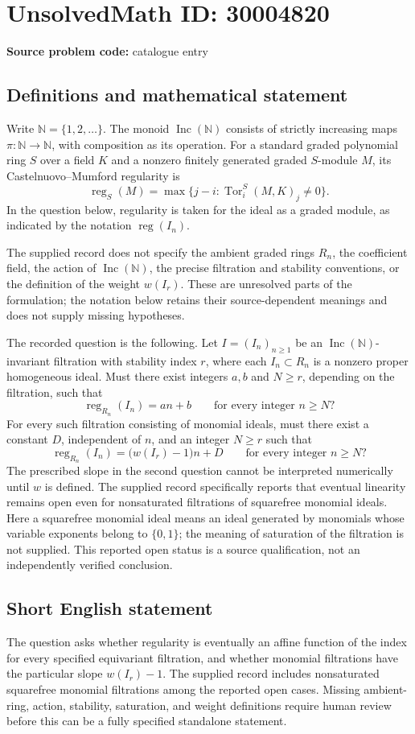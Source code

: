 \documentclass[11pt]{article}
\newcommand{\N}{\mathbb{N}}
\begin{document}
\section*{UnsolvedMath ID: 30004820}
\textbf{Source problem code:} catalogue entry
\subsection{Definitions and mathematical statement}
Write \(\N=\{1,2,\ldots\}\). The monoid \(\operatorname{Inc}(\N)\) consists of strictly increasing maps \(\pi:\N\to\N\), with composition as its operation. For a standard graded polynomial ring \(S\) over a field \(K\) and a nonzero finitely generated graded \(S\)-module \(M\), its Castelnuovo--Mumford regularity is
\[
\operatorname{reg}_S(M)=\max\{j-i:\operatorname{Tor}_i^S(M,K)_j\ne0\}.
\]
In the question below, regularity is taken for the ideal as a graded module, as indicated by the notation \(\operatorname{reg}(I_n)\).

The supplied record does not specify the ambient graded rings \(R_n\), the coefficient field, the action of \(\operatorname{Inc}(\N)\), the precise filtration and stability conventions, or the definition of the weight \(w(I_r)\). These are unresolved parts of the formulation; the notation below retains their source-dependent meanings and does not supply missing hypotheses.

The recorded question is the following. Let \(I=(I_n)_{n\ge1}\) be an \(\operatorname{Inc}(\N)\)-invariant filtration with stability index \(r\), where each \(I_n\subset R_n\) is a nonzero proper homogeneous ideal. Must there exist integers \(a,b\) and \(N\ge r\), depending on the filtration, such that
\[
\operatorname{reg}_{R_n}(I_n)=an+b
\qquad\text{for every integer }n\ge N?
\]
For every such filtration consisting of monomial ideals, must there exist a constant \(D\), independent of \(n\), and an integer \(N\ge r\) such that
\[
\operatorname{reg}_{R_n}(I_n)=\bigl(w(I_r)-1\bigr)n+D
\qquad\text{for every integer }n\ge N?
\]
The prescribed slope in the second question cannot be interpreted numerically until \(w\) is defined. The supplied record specifically reports that eventual linearity remains open even for nonsaturated filtrations of squarefree monomial ideals. Here a squarefree monomial ideal means an ideal generated by monomials whose variable exponents belong to \(\{0,1\}\); the meaning of saturation of the filtration is not supplied. This reported open status is a source qualification, not an independently verified conclusion.
\subsection{Short English statement}
The question asks whether regularity is eventually an affine function of the index for every specified equivariant filtration, and whether monomial filtrations have the particular slope \(w(I_r)-1\). The supplied record includes nonsaturated squarefree monomial filtrations among the reported open cases. Missing ambient-ring, action, stability, saturation, and weight definitions require human review before this can be a fully specified standalone statement.
\end{document}
